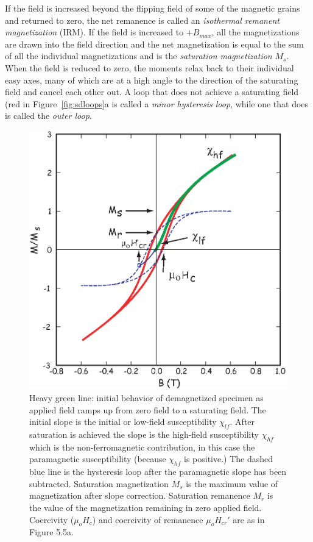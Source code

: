  If the field is increased beyond the flipping field of some of the magnetic grains and returned to zero, the net remanence is called an 
{\it isothermal remanent magnetization} (IRM).  If the field is increased to $+B_{max}$, all the magnetizations are drawn into the field direction and the net magnetization is equal to the sum of all the individual magnetizations and is the {\it saturation magnetization} $M_s$.    When the field is reduced to zero, the moments relax back to their individual easy axes, many of which are at a high angle to the direction of the saturating field and cancel each other out.   A loop that does not achieve a saturating field (red in Figure~\ref{fig:sdloops}a is called a {\it minor hysteresis loop}, while one that does is called the {\it outer loop}. 
 
 
\begin{figure}[htb]
\centering  \includegraphics[width=7.75 cm]{EPSfiles/Bcr.eps}
\caption{Heavy green line: initial behavior of demagnetized specimen as applied field ramps up from zero field to a saturating field.  The initial slope is the initial or low-field susceptibility $\chi_{lf}$.  After saturation is achieved the slope is the high-field susceptibility $\chi_{hf}$ which is the non-ferromagnetic contribution, in this case the paramagnetic susceptibility (because $\chi_{hf}$ is positive.) The dashed blue line is the hysteresis loop after the paramagnetic slope has been subtracted.  Saturation magnetization $M_s$ is the maximum value of magnetization after slope correction.  Saturation remanence $M_r$ is the value of the magnetization remaining in zero applied field.  Coercivity ($\mu_o H_c$) and coercivity of remanence $\mu_oH_{cr}'$ are as in Figure 5.5a. }
 \label{fig:Bcr}
\end{figure}

